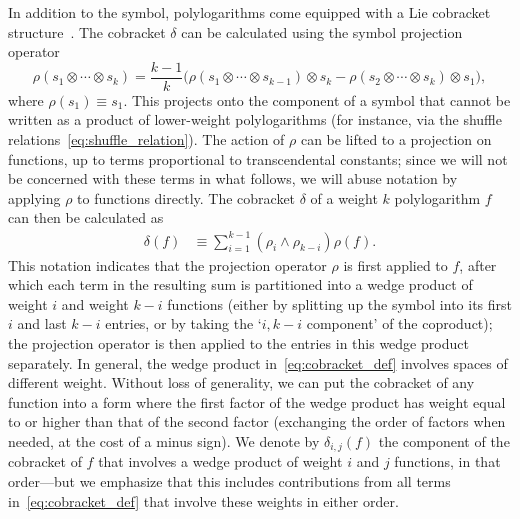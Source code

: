 \documentclass[11pt]{article}
\begin{document}
In addition to the symbol, polylogarithms come equipped with a Lie cobracket structure~\cite{Golden:2013xva}. The cobracket $\delta$ can be calculated using the symbol projection operator 
\begin{equation}
\rho(s_1 \otimes \cdots \otimes s_k ) = \frac{k-1}{k} \Big(\rho(s_1 \otimes \cdots \otimes s_{k-1}) \otimes s_k - \rho(s_2 \otimes \cdots \otimes s_{k}) \otimes s_1 \Big),
\end{equation}
where $\rho(s_1) \equiv s_1$. This projects onto the component of a symbol that cannot be written as a product of lower-weight polylogarithms (for instance, via the shuffle relations~\eqref{eq:shuffle_relation}). The action of $\rho$ can be lifted to a projection on functions, up to terms proportional to transcendental constants; since we will not be concerned with these terms in what follows, we will abuse notation by applying $\rho$ to functions directly. The cobracket $\delta$ of a weight $k$ polylogarithm $f$ can then be calculated as
\begin{align} \label{eq:cobracket_def}
\delta(f) &\equiv \sum_{i=1}^{k-1} (\rho_i \wedge \rho_{k-i})\rho(f) .
\end{align}
This notation indicates that the projection operator $\rho$ is first applied to $f$, after which each term in the resulting sum is partitioned into a wedge product of weight $i$ and weight $k-i$ functions (either by splitting up the symbol into its first $i$ and last $k-i$ entries, or by taking the `$i,k-i$ component' of the coproduct); the projection operator is then applied to the entries in this wedge product separately. In general, the wedge product in~\eqref{eq:cobracket_def} involves spaces of different weight. Without loss of generality, we can put the cobracket of any function into a form where the first factor of the wedge product has weight equal to or higher than that of the second factor (exchanging the order of factors when needed, at the cost of a minus sign). We denote by $\delta_{i,j}(f)$ the component of the cobracket of $f$ that involves a wedge product of weight $i$ and $j$ functions, in that order---but we emphasize that this includes contributions from all terms in~\eqref{eq:cobracket_def} that involve these weights in either order.
\end{document}
